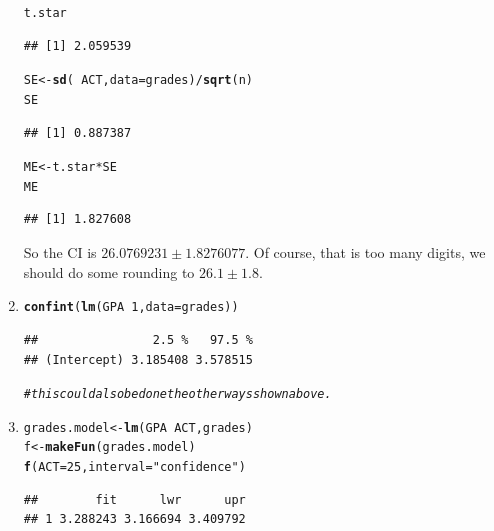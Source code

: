 \documentclass[twoside]{book}\usepackage[]{graphicx}\usepackage[]{xcolor}
\makeatletter
\newcommand{\hlnum}[1]{\textcolor[rgb]{0.686,0.059,0.569}{#1}}%
\newcommand{\hlstr}[1]{\textcolor[rgb]{0.192,0.494,0.8}{#1}}%
\newcommand{\hlcom}[1]{\textcolor[rgb]{0.678,0.584,0.686}{\textit{#1}}}%
\newcommand{\hlopt}[1]{\textcolor[rgb]{0,0,0}{#1}}%
\newcommand{\hlstd}[1]{\textcolor[rgb]{0.345,0.345,0.345}{#1}}%
\newcommand{\hlkwb}[1]{\textcolor[rgb]{0.69,0.353,0.396}{#1}}%
\newcommand{\hlkwc}[1]{\textcolor[rgb]{0.333,0.667,0.333}{#1}}%
\newcommand{\hlkwd}[1]{\textcolor[rgb]{0.737,0.353,0.396}{\textbf{#1}}}%
\newenvironment{kframe}{%
 \def\at@end@of@kframe{}%
 \ifinner\ifhmode%
  \def\at@end@of@kframe{\end{minipage}}%
  \begin{minipage}{\columnwidth}%
 \fi\fi%
 \def\FrameCommand##1{\hskip\@totalleftmargin \hskip-\fboxsep
 \colorbox{shadecolor}{##1}\hskip-\fboxsep
     \hskip-\linewidth \hskip-\@totalleftmargin \hskip\columnwidth}%
 \MakeFramed {\advance\hsize-\width
   \@totalleftmargin\z@ \linewidth\hsize
   \@setminipage}}%
 {\par\unskip\endMakeFramed%
 \at@end@of@kframe}
\newenvironment{knitrout}{}{} %
\makeatother
\begin{document}
\begin{solution}
\begin{enumerate}
\begin{knitrout}
\begin{kframe}
\begin{alltt}
\hlstd{t.star}
\end{alltt}
\begin{verbatim}
## [1] 2.059539
\end{verbatim}
\begin{alltt}
\hlstd{SE} \hlkwb{<-} \hlkwd{sd}\hlstd{(}\hlopt{~}\hlstd{ACT,} \hlkwc{data} \hlstd{= grades)}\hlopt{/}\hlkwd{sqrt}\hlstd{(n)}
\hlstd{SE}
\end{alltt}
\begin{verbatim}
## [1] 0.887387
\end{verbatim}
\begin{alltt}
\hlstd{ME} \hlkwb{<-} \hlstd{t.star} \hlopt{*} \hlstd{SE}
\hlstd{ME}
\end{alltt}
\begin{verbatim}
## [1] 1.827608
\end{verbatim}
\end{kframe}
\end{knitrout}
			So the CI is $26.0769231 \pm 1.8276077$.  Of course, that is too many digits, we 
			should do some rounding to
			$26.1 \pm 1.8$.  
		\item
\begin{knitrout}
\color{fgcolor}\begin{kframe}
\begin{alltt}
\hlkwd{confint}\hlstd{(}\hlkwd{lm}\hlstd{(GPA} \hlopt{~} \hlnum{1}\hlstd{,} \hlkwc{data} \hlstd{= grades))}
\end{alltt}
\begin{verbatim}
##                2.5 %   97.5 %
## (Intercept) 3.185408 3.578515
\end{verbatim}
\begin{alltt}
\hlcom{# this could also be done the other ways shown above.}
\end{alltt}
\end{kframe}
\end{knitrout}
		\item
\begin{knitrout}
\color{fgcolor}\begin{kframe}
\begin{alltt}
\hlstd{grades.model} \hlkwb{<-} \hlkwd{lm}\hlstd{(GPA} \hlopt{~} \hlstd{ACT, grades)}
\hlstd{f} \hlkwb{<-} \hlkwd{makeFun}\hlstd{(grades.model)}
\hlkwd{f}\hlstd{(}\hlkwc{ACT} \hlstd{=} \hlnum{25}\hlstd{,} \hlkwc{interval} \hlstd{=} \hlstr{"confidence"}\hlstd{)}
\end{alltt}
\begin{verbatim}
##        fit      lwr      upr
## 1 3.288243 3.166694 3.409792
\end{verbatim}
\end{kframe}
\end{knitrout}
		

\end{enumerate}
\end{solution}
\end{document}
